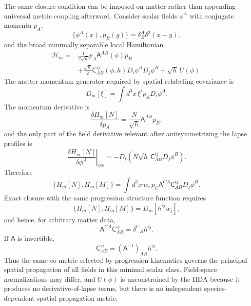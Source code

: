 \documentclass[11pt]{article}
\begin{document}
The same closure condition can be imposed on matter rather than appending universal metric coupling afterward. Consider scalar fields $\phi^A$ with conjugate momenta $p_A$,
\begin{equation}
    \{\phi^A(x),p_B(y)\}=\delta^A_B\delta^3(x-y),
\end{equation}
and the broad minimally separable local Hamiltonian
\begin{equation}
\boxed{
\begin{aligned}
\mathcal H_m={}&
\frac{1}{2\sqrt h}
 p_A\mathsf A^{AB}(\phi)p_B\\
&+\frac{\sqrt h}{2}
\mathsf C^{ij}_{AB}(\phi,h)
D_i\phi^A D_j\phi^B
+\sqrt h\,U(\phi).
\end{aligned}}
\label{eq:general_matter_H}
\end{equation}
The matter momentum generator required by spatial relabeling covariance is
\begin{equation}
    \boxed{D_m[\xi]=\int d^3x\,\xi^i p_A D_i\phi^A.}
    \label{eq:D_matter}
\end{equation}
The momentum derivative is
\begin{equation}
    \frac{\delta H_m[N]}{\delta p_A}
    =\frac{N}{\sqrt h}\mathsf A^{AB}p_B,
\end{equation}
and the only part of the field derivative relevant after antisymmetrizing the lapse profiles is
\begin{equation}
    \left.
    \frac{\delta H_m[N]}{\delta\phi^A}
    \right|_{\partial N}
    =-D_i\left(N\sqrt h\,\mathsf C^{ij}_{AB}D_j\phi^B\right).
\end{equation}
Therefore
\begin{equation}
\boxed{
\{H_m[N],H_m[M]\}
=\int d^3x\,w_i\,
 p_C\mathsf A^{CA}\mathsf C^{ij}_{AB}D_j\phi^B.}
\label{eq:matter_bracket}
\end{equation}
Exact closure with the same progression structure function requires
\begin{equation}
    \{H_m[N],H_m[M]\}=D_m[h^{ij}w_j],
\end{equation}
and hence, for arbitrary matter data,
\begin{equation}
\boxed{
\mathsf A^{CA}\mathsf C^{ij}_{AB}
=\delta^C{}_B h^{ij}.}
\label{eq:matter_closure_condition}
\end{equation}
If $\mathsf A$ is invertible,
\begin{equation}
\boxed{
\mathsf C^{ij}_{AB}
=(\mathsf A^{-1})_{AB}h^{ij}.}
\label{eq:C_metric_factorization}
\end{equation}
Thus the same co-metric selected by progression kinematics governs the principal spatial propagation of all fields in this minimal scalar class. Field-space normalizations may differ, and $U(\phi)$ is unconstrained by the HDA because it produces no derivative-of-lapse terms, but there is no independent species-dependent spatial propagation metric.
\end{document}

